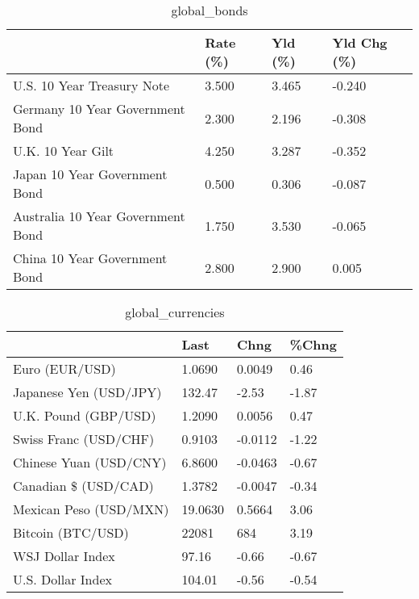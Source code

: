 \documentclass{article}%
\begin{document}
%


\begin{table}[htbp]%
\caption{global\_bonds}%
\centering%
\begin{adjustbox}{width=1\textwidth}%
\begin{tabular}{llll}
\toprule
                                  & Rate (\%) & Yld (\%) & Yld Chg (\%) \\
\midrule
       U.S. 10 Year Treasury Note &    3.500 &   3.465 &      -0.240 \\
  Germany 10 Year Government Bond &    2.300 &   2.196 &      -0.308 \\
                U.K. 10 Year Gilt &    4.250 &   3.287 &      -0.352 \\
    Japan 10 Year Government Bond &    0.500 &   0.306 &      -0.087 \\
Australia 10 Year Government Bond &    1.750 &   3.530 &      -0.065 \\
    China 10 Year Government Bond &    2.800 &   2.900 &       0.005 \\
\bottomrule
\end{tabular}
%
\end{adjustbox}%
\end{table}

%


\begin{table}[htbp]%
\caption{global\_currencies}%
\centering%
\begin{adjustbox}{width=1\textwidth}%
\begin{tabular}{llll}
\toprule
                       &    Last &    Chng & \%Chng \\
\midrule
        Euro (EUR/USD) &  1.0690 &  0.0049 &  0.46 \\
Japanese Yen (USD/JPY) &  132.47 &   -2.53 & -1.87 \\
  U.K. Pound (GBP/USD) &  1.2090 &  0.0056 &  0.47 \\
 Swiss Franc (USD/CHF) &  0.9103 & -0.0112 & -1.22 \\
Chinese Yuan (USD/CNY) &  6.8600 & -0.0463 & -0.67 \\
  Canadian \$ (USD/CAD) &  1.3782 & -0.0047 & -0.34 \\
Mexican Peso (USD/MXN) & 19.0630 &  0.5664 &  3.06 \\
     Bitcoin (BTC/USD) &   22081 &     684 &  3.19 \\
      WSJ Dollar Index &   97.16 &   -0.66 & -0.67 \\
     U.S. Dollar Index &  104.01 &   -0.56 & -0.54 \\
\bottomrule
\end{tabular}
%
\end{adjustbox}%
\end{table}
\end{document}
